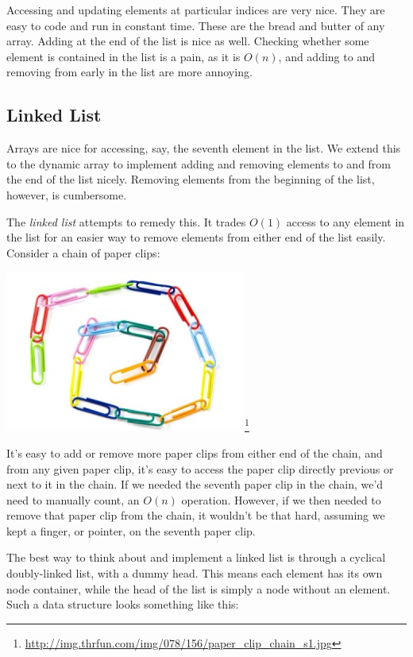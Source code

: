 Accessing and updating elements at particular indices are very nice. They are easy to code and run in constant time. These are the bread and butter of any array. Adding at the end of the list is nice as well. Checking whether some element is contained in the list is a pain, as it is $O(n)$, and adding to and removing from early in the list are more annoying.

\subsection{Linked List}

Arrays are nice for accessing, say, the seventh element in the list. We extend this to the dynamic array to implement adding and removing elements to and from the end of the list nicely. Removing elements from the beginning of the list, however, is cumbersome.

The \textit{linked list} attempts to remedy this. It trades $O(1)$ access to any element in the list for an easier way to remove elements from either end of the list easily. Consider a chain of paper clips:

\begin{center}

\includegraphics{images/paper_clip_chain.jpg}\footnote{\url{http://img.thrfun.com/img/078/156/paper_clip_chain_s1.jpg}}

\end{center}

It's easy to add or remove more paper clips from either end of the chain, and from any given paper clip, it's easy to access the paper clip directly previous or next to it in the chain. If we needed the seventh paper clip in the chain, we'd need to manually count, an $O(n)$ operation. However, if we then needed to remove that paper clip from the chain, it wouldn't be that hard, assuming we kept a finger, or pointer, on the seventh paper clip.

The best way to think about and implement a linked list is through a cyclical doubly-linked list, with a dummy head. This means each element has its own node container, while the head of the list is simply a node without an element. Such a data structure looks something like this:

